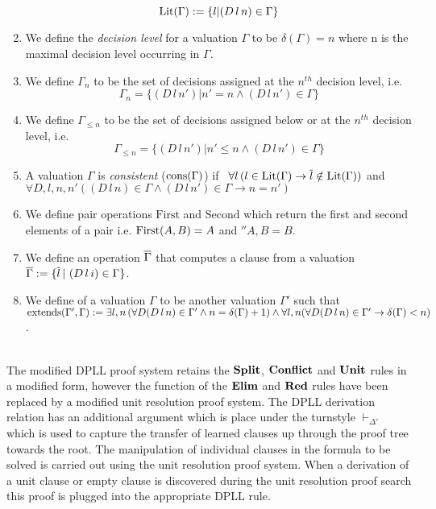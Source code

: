 \begin{mydef}
\begin{enumerate}
	 $$ \mathrm{Lit}(\Gamma) := \{l | (D \, l \, n) \in \Gamma\}$$
%
%
%
\item We define the \emph{decision level} for a valuation $\Gamma$ to be $\delta (\Gamma) = n$ where n is the maximal decision level occurring in $\Gamma$.
%
\item We define $\Gamma_{n}$ to be the set of  decisions assigned at the $n^{th}$ decision level, i.e. 
	$$\Gamma_{n} = \{(D \, l \, n') | n' = n  \wedge (D \, l \, n') \in \Gamma \}$$
%
\item We define $\Gamma_{\leq n}$ to be the set of decisions assigned below or at the $n^{th}$ decision level, i.e. 
	$$\Gamma_{\leq n} = \{( D \, l \, n') | n' \leq n \wedge (D \, l \, n') \in \Gamma \}$$
%
\item A valuation $\Gamma$ is \emph{consistent} ($\mathrm{cons}(\Gamma)$) if \, 
%
$\forall l \,( l \in \mathrm{Lit}(\Gamma) \to \overline{l} \notin \mathrm{Lit}(\Gamma))$
%
 and 
%
$\forall D,l,n,n'( (D \, l \, n) \in \Gamma \wedge (D \, l \, n') \in \Gamma \to n = n')$
%
%
%
\item We define pair operations $\mathrm{First}$ and $\mathrm{Second}$ which return the first and second elements of a pair i.e. $\mathrm{First}(A,B) = A$ and $\second{A,B} = B$.
%
\item We define an operation $\overline{\Gamma}$ that computes a clause from a valuation $\overline{\Gamma} := \{ \overline{l}\, | \, \, (D \, l \, i) \in \Gamma \}$.
%
\item We define of a valuation $\Gamma$ to be another valuation $\Gamma'$ such that $\mathrm{extends(\Gamma',\Gamma)} :=  \exists l,n \, ( \forall D (D \, l \, n) \in \Gamma' \wedge n  = \delta(\Gamma) + 1) \wedge \forall l,n ( \forall D (D \, l \, n) \in \Gamma' \to  \delta(\Gamma) < n)$.

\end{enumerate}
\end{mydef}
\hspace{1mm} \\
%
The modified DPLL proof system retains the $\mathbf{Split}$, $\mathbf{Conflict}$ and $\mathbf{Unit}$ rules in a modified form, however the function of the $\mathbf{Elim}$ and $\mathbf{Red}$ rules have been replaced by a modified unit resolution proof system. The DPLL derivation relation has an additional argument which is place under the turnstyle $\vdash_{\Delta'}$ which is used to capture the transfer of learned clauses up through the proof tree towards the root. The manipulation of individual clauses in the formula to be solved is carried out using the unit resolution proof system. When a derivation of a unit clause or empty clause is discovered during the unit resolution proof search this proof is plugged into the appropriate DPLL rule. \\
